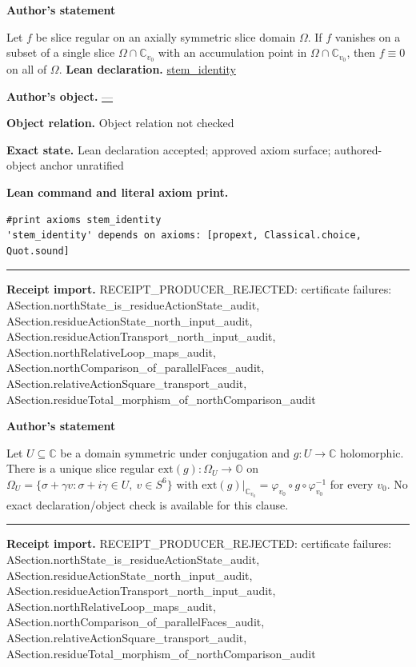 \documentclass[11pt]{article}
\newcommand{\OO}{\mathbb{O}}
\newcommand{\CC}{\mathbb{C}}
\theoremstyle{plain}
\theoremstyle{definition}
\theoremstyle{remark}
\begin{document}
\medskip
\begin{tcolorbox}[provenancecard,title={14. Theorem - Identity Theorem; \{\textbackslash{}cite[Cor.\textasciitilde{}5.1.9]\{CSS12\}\}},title after break={14. Theorem - Identity Theorem; \{\textbackslash{}cite[Cor.\textasciitilde{}5.1.9]\{CSS12\}\} (continued)}]
\textbf{Author's statement}\par
Let $f$ be slice regular on an axially symmetric slice domain $\Omega$. If $f$
vanishes on a subset of a single slice $\Omega\cap\CC_{v_0}$ with an accumulation
point in $\Omega\cap\CC_{v_0}$, then $f\equiv0$ on all of $\Omega$.
\tcblower
\textbf{Lean declaration.} \url{stem_identity}
\par\textbf{Author's object.} \url{—}
\par\textbf{Object relation.} Object relation not checked
\par\textbf{Exact state.} Lean declaration accepted; approved axiom surface; authored-object anchor unratified
\par\smallskip\textbf{Lean command and literal axiom print.}
\begin{Verbatim}[breaklines=true,breakanywhere=true,fontsize=\small]
#print axioms stem_identity
'stem_identity' depends on axioms: [propext, Classical.choice, Quot.sound]
\end{Verbatim}
\medskip\hrule\medskip
\textbf{Receipt import.} \textcolor{KgtRed}{RECEIPT\_PRODUCER\_REJECTED: certificate failures: ASection.northState\_is\_residueActionState\_audit, ASection.residueActionState\_north\_input\_audit, ASection.residueActionTransport\_north\_input\_audit, ASection.northRelativeLoop\_maps\_audit, ASection.northComparison\_of\_parallelFaces\_audit, ASection.relativeActionSquare\_transport\_audit, ASection.residueTotal\_morphism\_of\_northComparison\_audit}
\end{tcolorbox}
\medskip
\begin{tcolorbox}[provenancecard,title={15. Theorem - Extension Theorem; \{\textbackslash{}cite[Thm.\textasciitilde{}5.1.5]\{CSS12\}\}},title after break={15. Theorem - Extension Theorem; \{\textbackslash{}cite[Thm.\textasciitilde{}5.1.5]\{CSS12\}\} (continued)}]
\textbf{Author's statement}\par
Let $U\subseteq\CC$ be a domain symmetric under conjugation and $g:U\to\CC$
holomorphic. There is a unique slice regular $\mathrm{ext}(g):\Omega_U\to\OO$ on
$\Omega_U=\{\sigma+\gamma v:\sigma+i\gamma\in U,\ v\in S^6\}$ with
$\mathrm{ext}(g)|_{\CC_{v_0}}=\varphi_{v_0}\circ g\circ\varphi_{v_0}^{-1}$ for every
$v_0$.
\tcblower
\textcolor{KgtRed}{No exact declaration/object check is available for this clause.}
\medskip\hrule\medskip
\textbf{Receipt import.} \textcolor{KgtRed}{RECEIPT\_PRODUCER\_REJECTED: certificate failures: ASection.northState\_is\_residueActionState\_audit, ASection.residueActionState\_north\_input\_audit, ASection.residueActionTransport\_north\_input\_audit, ASection.northRelativeLoop\_maps\_audit, ASection.northComparison\_of\_parallelFaces\_audit, ASection.relativeActionSquare\_transport\_audit, ASection.residueTotal\_morphism\_of\_northComparison\_audit}
\end{tcolorbox}
\end{document}
